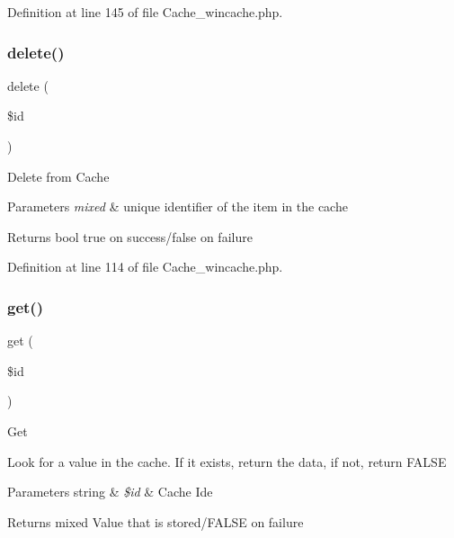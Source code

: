 Definition at line 145 of file Cache\+\_\+wincache.\+php.

\mbox{\label{class_c_i___cache__wincache_a2f8258add505482d7f00ea26493a5723}} 
\subsubsection{\texorpdfstring{delete()}{delete()}}
{\footnotesize\ttfamily delete (\begin{DoxyParamCaption}\item[{}]{\$id }\end{DoxyParamCaption})}

Delete from Cache


\begin{DoxyParams}{Parameters}
{\em mixed} & unique identifier of the item in the cache \\
\hline
\end{DoxyParams}
\begin{DoxyReturn}{Returns}
bool true on success/false on failure 
\end{DoxyReturn}


Definition at line 114 of file Cache\+\_\+wincache.\+php.

\mbox{\label{class_c_i___cache__wincache_a50e3bfb586b2f42932a6a93f3fbb0828}} 
\subsubsection{\texorpdfstring{get()}{get()}}
{\footnotesize\ttfamily get (\begin{DoxyParamCaption}\item[{}]{\$id }\end{DoxyParamCaption})}

Get

Look for a value in the cache. If it exists, return the data, if not, return F\+A\+L\+SE


\begin{DoxyParams}[1]{Parameters}
string & {\em \$id} & Cache Ide \\
\hline
\end{DoxyParams}
\begin{DoxyReturn}{Returns}
mixed Value that is stored/\+F\+A\+L\+SE on failure 
\end{DoxyReturn}


